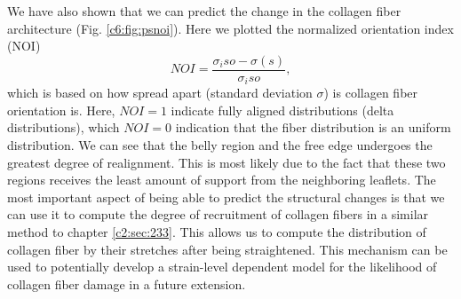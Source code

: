     
    We have also shown that we can predict the change in the collagen fiber architecture (Fig. \ref{c6:fig:psnoi}). Here we plotted the normalized orientation index (NOI)
    \begin{equation}
        NOI = \frac{\sigma_iso - \sigma(s)}{\sigma_iso},
    \end{equation}
    which is based on how spread apart (standard deviation $\sigma$) is collagen fiber orientation is. Here, $NOI = 1$ indicate fully aligned distributions (delta distributions), which $NOI = 0$ indication that the fiber distribution is an uniform distribution. We can see that the belly region and the free edge undergoes the greatest degree of realignment. This is most likely due to the fact that these two regions receives the least amount of support from the neighboring leaflets. The most important aspect of being able to predict the structural changes is that we can use it to compute the degree of recruitment of collagen fibers in a similar method to chapter \ref{c2:sec:233}. This allows us to compute the distribution of collagen fiber by their stretches after being straightened. This mechanism can be used to potentially develop a strain-level dependent model for the likelihood of collagen fiber damage in a future extension. 

    
